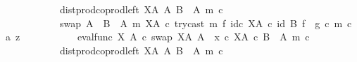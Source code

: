 \begin{isabellebody}
\ \ \ \ \ \ \ \ \ \ \ \ dist{\isacharunderscore}{\kern0pt}prod{\isacharunderscore}{\kern0pt}coprod{\isacharunderscore}{\kern0pt}left\ {\isacharparenleft}{\kern0pt}X\isactrlbsup A\isactrlesup {\isacharparenright}{\kern0pt}\ A\ {\isacharparenleft}{\kern0pt}B\ {\isasymsetminus}\ {\isacharparenleft}{\kern0pt}A{\isacharcomma}{\kern0pt}\ m{\isacharparenright}{\kern0pt}{\isacharparenright}{\kern0pt}\ {\isasymcirc}\isactrlsub c\isanewline
\ \ \ \ \ \ \ \ \ \ \ \ swap\ {\isacharparenleft}{\kern0pt}A\ {\isasymCoprod}\ {\isacharparenleft}{\kern0pt}B\ {\isasymsetminus}\ {\isacharparenleft}{\kern0pt}A{\isacharcomma}{\kern0pt}\ m{\isacharparenright}{\kern0pt}{\isacharparenright}{\kern0pt}{\isacharparenright}{\kern0pt}\ {\isacharparenleft}{\kern0pt}X\isactrlbsup A\isactrlesup {\isacharparenright}{\kern0pt}\ {\isasymcirc}\isactrlsub c\ try{\isacharunderscore}{\kern0pt}cast\ m\ {\isasymtimes}\isactrlsub f\ id\isactrlsub c\ {\isacharparenleft}{\kern0pt}X\isactrlbsup A\isactrlesup {\isacharparenright}{\kern0pt}{\isacharparenright}{\kern0pt}\ {\isasymcirc}\isactrlsub c\ {\isacharparenleft}{\kern0pt}id\ B\ {\isasymtimes}\isactrlsub f\ \ g{\isacharparenright}{\kern0pt}{\isacharparenright}{\kern0pt}\ {\isasymcirc}\isactrlsub c\ {\isasymlangle}m\ {\isasymcirc}\isactrlsub c\ a{\isacharcomma}{\kern0pt}\ z{\isasymrangle}\isanewline
\ \ \ \ \ \ \ \ \ \ {\isacharequal}{\kern0pt}\ {\isacharparenleft}{\kern0pt}{\isacharparenleft}{\kern0pt}{\isacharparenleft}{\kern0pt}eval{\isacharunderscore}{\kern0pt}func\ X\ A\ {\isasymcirc}\isactrlsub c\ swap\ {\isacharparenleft}{\kern0pt}X\isactrlbsup A\isactrlesup {\isacharparenright}{\kern0pt}\ A{\isacharparenright}{\kern0pt}\ {\isasymamalg}\ {\isacharparenleft}{\kern0pt}x\ {\isasymcirc}\isactrlsub c\ {\isasymbeta}\isactrlbsub X\isactrlbsup A\isactrlesup \ {\isasymtimes}\isactrlsub c\ {\isacharparenleft}{\kern0pt}B\ {\isasymsetminus}\ {\isacharparenleft}{\kern0pt}A{\isacharcomma}{\kern0pt}\ m{\isacharparenright}{\kern0pt}{\isacharparenright}{\kern0pt}\isactrlesub {\isacharparenright}{\kern0pt}\ {\isasymcirc}\isactrlsub c\isanewline
\ \ \ \ \ \ \ \ \ \ \ \ dist{\isacharunderscore}{\kern0pt}prod{\isacharunderscore}{\kern0pt}coprod{\isacharunderscore}{\kern0pt}left\ {\isacharparenleft}{\kern0pt}X\isactrlbsup A\isactrlesup {\isacharparenright}{\kern0pt}\ A\ {\isacharparenleft}{\kern0pt}B\ {\isasymsetminus}\ {\isacharparenleft}{\kern0pt}A{\isacharcomma}{\kern0pt}\ m{\isacharparenright}{\kern0pt}{\isacharparenright}{\kern0pt}\ {\isasymcirc}\isactrlsub c\isanewline

\end{isabellebody}
